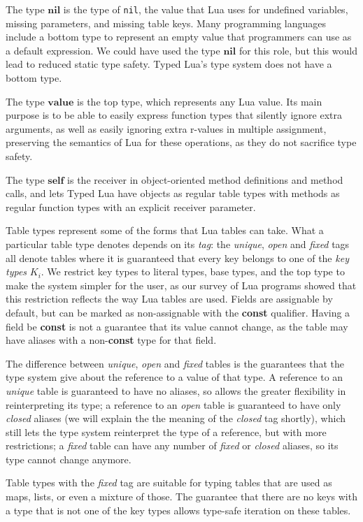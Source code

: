 \documentclass{sigplanconf}
\newcommand{\Value}{\mathbf{value}}
\newcommand{\Nil}{\mathbf{nil}}
\newcommand{\Self}{\mathbf{self}}
\begin{document}
The type $\Nil$ is the type of {\tt nil}, the value that Lua uses for
undefined variables, missing parameters, and missing table keys.
Many programming languages include a bottom type to represent
an empty value that programmers can use as a default expression.
We could have used the type $\Nil$ for this role, but
this would lead to reduced static type safety. Typed Lua's
type system does not have a bottom type.

The type $\Value$ is the top type, which represents any Lua value.
Its main purpose is to be able to easily express function types
that silently ignore extra arguments, as well as easily ignoring extra r-values in multiple assignment, preserving the semantics of Lua for these operations, as they do not sacrifice type safety.

The type $\Self$ is the receiver in object-oriented method
definitions and method calls, and lets Typed Lua have objects
as regular table types with methods as regular function types
with an explicit receiver parameter.

Table types represent some of the forms that Lua
tables can take. What a particular table type denotes
depends on its {\em tag}: the {\em unique}, {\em open}
and {\em fixed} tags all denote tables where it is
guaranteed that every key belongs to one of the {\em key
types} $K_i$. We restrict key types to literal types,
base types, and the top type to make the system simpler
for the user, as our survey of Lua programs showed that
this restriction reflects the way Lua tables are used.
Fields are assignable by default, but can be marked
as non-assignable with the {\bf const} qualifier. Having
a field be {\bf const} is not a guarantee that its
value cannot change, as the table may have aliases with
a non-{\bf const} type for that field.

The difference between {\em unique}, {\em open} and
{\em fixed} tables is the guarantees that the type system
give about the reference to a value of that type. A reference
to an {\em unique} table is guaranteed to have no aliases,
so allows the greater flexibility in reinterpreting its type;
a reference to an {\em open} table is guaranteed to have
only {\em closed} aliases (we will explain the the meaning of the {\em closed} tag shortly), which still lets the type system
reinterpret the type of a reference, but with more
restrictions; a {\em fixed} table can have any number of {\em fixed} or {\em closed} aliases, so its type cannot change
anymore.

Table types with the {\em fixed} tag are suitable for typing tables that are used as maps, lists, or even a mixture of those. The guarantee that there are no keys with a type that is not
one of the key types allows type-safe iteration on these
tables.
\end{document}
